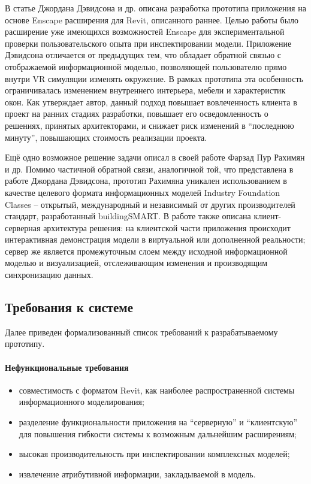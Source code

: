 В статье Джордана Дэвидсона и др. описана разработка прототипа приложения
на основе Enscape расширения для Revit, описанного раннее.
\cite{Davidson2019}
Целью работы было расширение уже имеющихся возможностей Enscape
для экспериментальной проверки пользовательского опыта при инспектировании модели.
Приложение Дэвидсона отличается от предыдущих тем,
что обладает обратной связью с отображаемой информационной моделью,
позволяющей пользователю прямо внутри VR симуляции изменять окружение.
В рамках прототипа эта особенность ограничивалась изменением
внутреннего интерьера, мебели и характеристик окон.
Как утверждает автор, данный подход повышает вовлеченность
клиента в проект на ранних стадиях разработки,
повышает его осведомленность о решениях, принятых архитекторами,
и снижает риск изменений в ``последнюю минуту'',
повышающих стоимость реализации проекта.

Ещё одно возможное решение задачи описал в своей работе Фарзад Пур Рахимян и др.
\cite{PourRahimian2019}
Помимо частичной обратной связи, аналогичной той,
что представлена в работе Джордана Дэвидсона,
прототип Рахимяна уникален использованием в качестве целевого формата информационных моделей
Industry Foundation Classes -- открытый, международный и
независимый от других производителей стандарт,
разработанный buildingSMART.
\cite{BuildingSmartIFC}
В работе также описана клиент-серверная архитектура решения:
на клиентской части приложения происходит интерактивная демонстрация модели
в виртуальной или дополненной реальности;
сервер же является промежуточным слоем между исходной информационной моделью и визуализацией,
отслеживающим изменения и производящим синхронизацию данных.

\subsection{Требования к системе}

Далее приведен формализованный список требований к разрабатываемому прототипу.

\paragraph{Нефункциональные требования}
\begin{itemize}
    \item совместимость с форматом Revit,
    как наиболее распространенной системы информационного моделирования;
    \item разделение функциональности приложения на ``серверную'' и ``клиентскую''
    для повышения гибкости системы к возможным дальнейшим расширениям;
    \item высокая производительность при инспектировании комплексных моделей;
    \item извлечение атрибутивной информации,
    закладываемой в модель.
\end{itemize}

